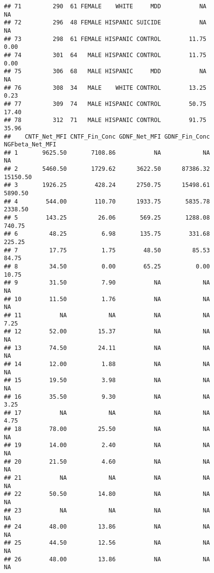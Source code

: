 \documentclass[]{article}
\begin{document}
\begin{verbatim}
## 71         290  61 FEMALE    WHITE     MDD           NA            NA
## 72         296  48 FEMALE HISPANIC SUICIDE           NA            NA
## 73         298  61 FEMALE HISPANIC CONTROL        11.75          0.00
## 74         301  64   MALE HISPANIC CONTROL        11.75          0.00
## 75         306  68   MALE HISPANIC     MDD           NA            NA
## 76         308  34   MALE    WHITE CONTROL        13.25          0.23
## 77         309  74   MALE HISPANIC CONTROL        50.75         17.40
## 78         312  71   MALE HISPANIC CONTROL        91.75         35.96
##    CNTF_Net_MFI CNTF_Fin_Conc GDNF_Net_MFI GDNF_Fin_Conc NGFbeta_Net_MFI
## 1       9625.50       7108.86           NA            NA              NA
## 2       5460.50       1729.62      3622.50      87386.32        15150.50
## 3       1926.25        428.24      2750.75      15498.61         5890.50
## 4        544.00        110.70      1933.75       5835.78         2338.50
## 5        143.25         26.06       569.25       1288.08          740.75
## 6         48.25          6.98       135.75        331.68          225.25
## 7         17.75          1.75        48.50         85.53           84.75
## 8         34.50          0.00        65.25          0.00           10.75
## 9         31.50          7.90           NA            NA              NA
## 10        11.50          1.76           NA            NA              NA
## 11           NA            NA           NA            NA            7.25
## 12        52.00         15.37           NA            NA              NA
## 13        74.50         24.11           NA            NA              NA
## 14        12.00          1.88           NA            NA              NA
## 15        19.50          3.98           NA            NA              NA
## 16        35.50          9.30           NA            NA            3.25
## 17           NA            NA           NA            NA            4.75
## 18        78.00         25.50           NA            NA              NA
## 19        14.00          2.40           NA            NA              NA
## 20        21.50          4.60           NA            NA              NA
## 21           NA            NA           NA            NA              NA
## 22        50.50         14.80           NA            NA              NA
## 23           NA            NA           NA            NA              NA
## 24        48.00         13.86           NA            NA              NA
## 25        44.50         12.56           NA            NA              NA
## 26        48.00         13.86           NA            NA              NA

\end{verbatim}
\end{document}
